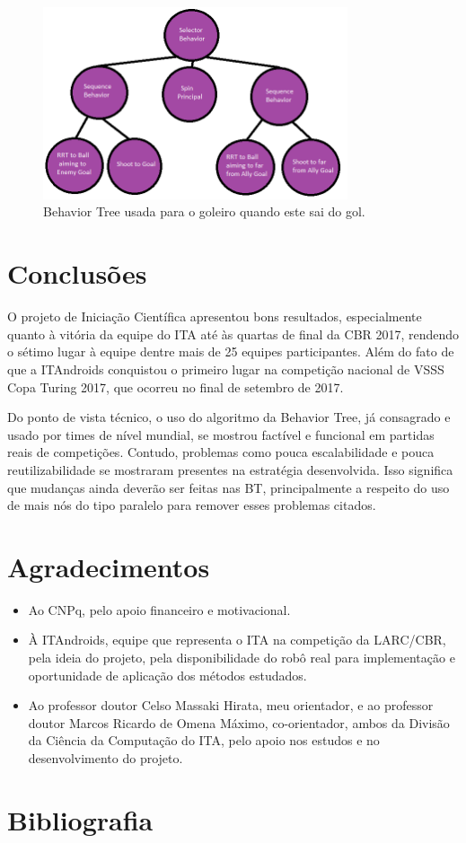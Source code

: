 \documentclass[a4paper,12pt]{article}
\begin{document}
\begin{figure}[H]
	\centering
	\includegraphics[width=0.8\textwidth]{figures/LastGoalierOutOfGoal.png}
   	\caption{Behavior Tree usada para o goleiro quando este sai do gol.} \label{fig:OutOfGoal_BT}
\end{figure}


\section{Conclusões}

O projeto de Iniciação Científica apresentou bons resultados, especialmente quanto à vitória da equipe do ITA até às quartas de final da CBR 2017, rendendo o sétimo lugar à equipe dentre mais de 25 equipes participantes. Além do fato de que a ITAndroids conquistou o primeiro lugar na competição nacional de VSSS Copa Turing 2017, que ocorreu no final de setembro de 2017.

Do ponto de vista técnico, o uso do algoritmo da Behavior Tree, já consagrado e usado por times de nível mundial, se mostrou factível e funcional em partidas reais de competições. Contudo, problemas como pouca escalabilidade e pouca reutilizabilidade se mostraram presentes na estratégia desenvolvida. Isso significa que mudanças ainda deverão ser feitas nas BT, principalmente a respeito do uso de mais nós do tipo paralelo para remover esses problemas citados.

\section{Agradecimentos}

\begin{itemize}
\item Ao CNPq, pelo apoio financeiro e motivacional.
\item À ITAndroids, equipe que representa o ITA na competição da LARC/CBR, pela ideia do projeto, pela disponibilidade do robô real para implementação e oportunidade de aplicação dos métodos estudados.
\item Ao professor doutor Celso Massaki Hirata, meu orientador, e ao professor doutor Marcos Ricardo de Omena Máximo, co-orientador, ambos da Divisão da Ciência da Computação do ITA, pelo apoio nos estudos e no desenvolvimento do projeto.

\end{itemize}

\section{Bibliografia}

\printbibliography
\end{document}
